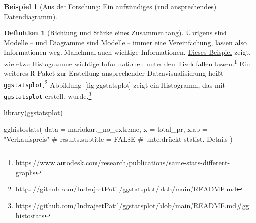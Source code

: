 \documentclass[
  a4paper,
]{scrbook}
\newenvironment{Shaded}{\begin{snugshade}}{\end{snugshade}}
\newcommand{\AttributeTok}[1]{\textcolor[rgb]{0.40,0.45,0.13}{#1}}
\newcommand{\CommentTok}[1]{\textcolor[rgb]{0.37,0.37,0.37}{#1}}
\newcommand{\FunctionTok}[1]{\textcolor[rgb]{0.28,0.35,0.67}{#1}}
\newcommand{\NormalTok}[1]{\textcolor[rgb]{0.00,0.23,0.31}{#1}}
\newcommand{\StringTok}[1]{\textcolor[rgb]{0.13,0.47,0.30}{#1}}
\theoremstyle{definition}
\newtheorem{example}{Beispiel}[chapter]
\theoremstyle{definition}
\newtheorem{definition}{Definition}[chapter]
\theoremstyle{definition}
\theoremstyle{remark}
\begin{document}
\begin{example}[Aus der Forschung: Ein aufwändiges (und ansprechendes)
Datendiagramm]
\begin{definition}[Richtung und Stärke eines
Zusammenhang]
Übrigens sind Modelle -- und Diagramme sind Modelle -- immer eine
Vereinfachung, lassen also Informationen weg. Manchmal auch wichtige
Informationen.
\href{https://www.autodesk.com/research/publications/same-stats-different-graphs}{Dieses
Beispiel} zeigt, wie etwa Histogramme wichtige Informationen unter den
Tisch fallen lassen.\footnote{\url{https://www.autodesk.com/research/publications/same-stats-different-graphs}}
Ein weiteres R-Paket zur Erstellung ansprechender Datenvisualisierung
heißt
\href{https://github.com/IndrajeetPatil/ggstatsplot/blob/main/README.md}{\texttt{ggstatsplot}}.\footnote{\url{https://github.com/IndrajeetPatil/ggstatsplot/blob/main/README.md}}
Abbildung~\ref{fig-ggstatsplot} zeigt ein
\href{https://github.com/IndrajeetPatil/ggstatsplot/blob/main/README.md\#gghistostats}{Histogramm},
das mit \texttt{ggstatsplot} erstellt wurde.\footnote{\url{https://github.com/IndrajeetPatil/ggstatsplot/blob/main/README.md\#gghistostats}}

\begin{Shaded}
\begin{Highlighting}[]
\FunctionTok{library}\NormalTok{(ggstatsplot)}

\FunctionTok{gghistostats}\NormalTok{(}
  \AttributeTok{data       =}\NormalTok{ mariokart\_no\_extreme,}
  \AttributeTok{x          =}\NormalTok{ total\_pr,}
  \AttributeTok{xlab       =} \StringTok{"Verkaufspreis"} 
  \CommentTok{\# results.subtitle = FALSE   \# unterdrückt statist. Details}
\NormalTok{)}
\end{Highlighting}
\end{Shaded}

\begin{figure}[H]

\end{figure}
\end{definition}
\end{example}
\end{document}
